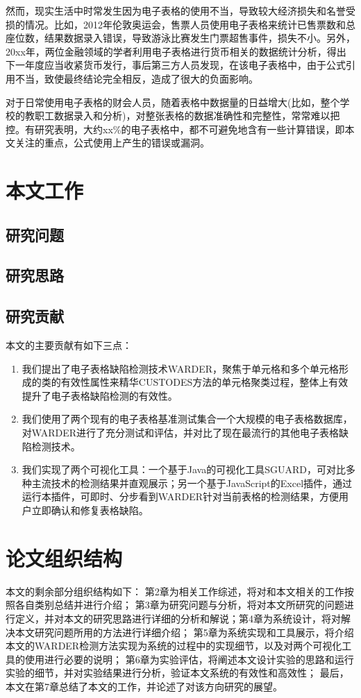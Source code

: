 然而，现实生活中时常发生因为电子表格的使用不当，导致较大经济损失和名誉受损的情况。比如，2012年伦敦奥运会，售票人员使用电子表格来统计已售票数和总座位数，结果数据录入错误，导致游泳比赛发生门票超售事件，损失不小。另外，20xx年，两位金融领域的学者利用电子表格进行货币相关的数据统计分析，得出下一年度应当收紧货币发行，事后第三方人员发现，在该电子表格中，由于公式引用不当，致使最终结论完全相反，造成了很大的负面影响。

对于日常使用电子表格的财会人员，随着表格中数据量的日益增大(比如，整个学校的教职工数据录入和分析)，对整张表格的数据准确性和完整性，常常难以把控。有研究表明，大约xx\%的电子表格中，都不可避免地含有一些计算错误，即本文关注的重点，公式使用上产生的错误或漏洞。

\section{本文工作}

\subsection{研究问题}


\subsection{研究思路}


\subsection{研究贡献}

本文的主要贡献有如下三点：

\begin{enumerate}
    \item 我们提出了电子表格缺陷检测技术WARDER，聚焦于单元格和多个单元格形成的类的有效性属性来精华CUSTODES方法的单元格聚类过程，整体上有效提升了电子表格缺陷检测的有效性。
    \item 我们使用了两个现有的电子表格基准测试集合一个大规模的电子表格数据库，对WARDER进行了充分测试和评估，并对比了现在最流行的其他电子表格缺陷检测技术。
    \item 我们实现了两个可视化工具：一个基于Java的可视化工具SGUARD，可对比多种主流技术的检测结果并直观展示；另一个基于JavaScript的Excel插件，通过运行本插件，可即时、分步看到WARDER针对当前表格的检测结果，方便用户立即确认和修复表格缺陷。
\end{enumerate}

\section{论文组织结构}

本文的剩余部分组织结构如下：
第2章为相关工作综述，将对和本文相关的工作按照各自类别总结并进行介绍；
第3章为研究问题与分析，将对本文所研究的问题进行定义，并对本文的研究思路进行详细的分析和解说；第4章为系统设计，将对解决本文研究问题所用的方法进行详细介绍；
第5章为系统实现和工具展示，将介绍本文的WARDER检测方法实现为系统的过程中的实现细节，以及对两个可视化工具的使用进行必要的说明；
第6章为实验评估，将阐述本文设计实验的思路和运行实验的细节，并对实验结果进行分析，验证本文系统的有效性和高效性；
最后，本文在第7章总结了本文的工作，并论述了对该方向研究的展望。